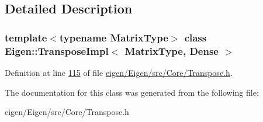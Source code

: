 \subsection{Detailed Description}
\subsubsection*{template$<$typename Matrix\+Type$>$\newline
class Eigen\+::\+Transpose\+Impl$<$ Matrix\+Type, Dense $>$}



Definition at line \hyperlink{eigen_2_eigen_2src_2_core_2_transpose_8h_source_l00115}{115} of file \hyperlink{eigen_2_eigen_2src_2_core_2_transpose_8h_source}{eigen/\+Eigen/src/\+Core/\+Transpose.\+h}.



The documentation for this class was generated from the following file\+:\begin{DoxyCompactItemize}
\item 
eigen/\+Eigen/src/\+Core/\+Transpose.\+h\end{DoxyCompactItemize}
